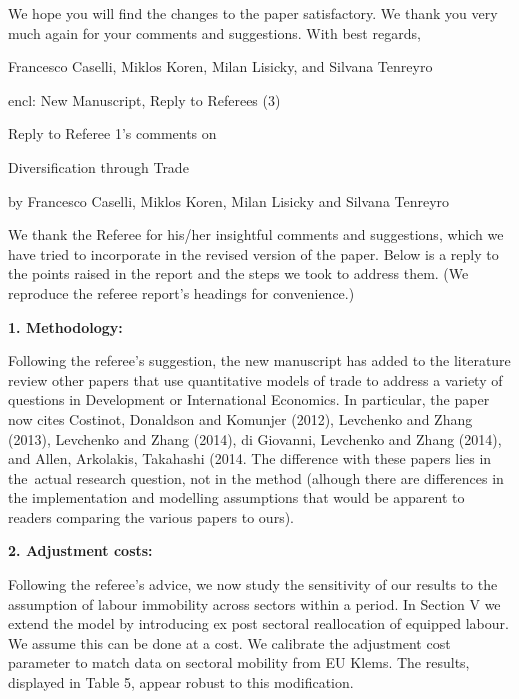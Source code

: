 \documentclass[12pt]{article}
\begin{document}
We hope you will find the changes to the paper satisfactory. We thank you
very much again for your comments and suggestions. With best regards,\bigskip

Francesco Caselli, Miklos Koren, Milan Lisicky, and Silvana Tenreyro

encl: New Manuscript, Reply to Referees (3)

\begin{center}
\pagebreak

\thispagestyle{plain}\setcounter{page}{1}Reply to Referee 1's comments on

{\Large Diversification through Trade}

by Francesco Caselli, Miklos Koren, Milan Lisicky and Silvana
Tenreyro\medskip

\bigskip \bigskip
\end{center}

We thank the Referee for his/her insightful comments and suggestions, which
we have tried to incorporate in the revised version of the paper. Below is a
reply to the points raised in the report and the steps we took to address
them. (We reproduce the referee report's headings for convenience.)\bigskip

\textbf{1. Methodology: }

Following the referee's suggestion, the new manuscript has added to the
literature review other papers that use quantitative models of trade to
address a variety of questions in Development or International Economics. In
particular, the paper now cites Costinot, Donaldson and Komunjer (2012),
Levchenko and Zhang (2013), Levchenko and Zhang (2014), di Giovanni,
Levchenko and Zhang (2014), and Allen, Arkolakis, Takahashi (2014. The
difference with these papers lies in the\ actual research question, not in
the method (alhough there are differences in the implementation and
modelling assumptions that would be apparent to readers comparing the
various papers to ours).\bigskip

\textbf{2. Adjustment costs:}

Following the referee's advice, we now study the sensitivity of our results
to the assumption of labour immobility across sectors within a period. In
Section V we extend the model by introducing ex post sectoral reallocation
of equipped labour. We assume this can be done at a cost. We calibrate the
adjustment cost parameter to match data on sectoral mobility from EU Klems.
The results, displayed in Table 5, appear robust to this modification.
\end{document}
